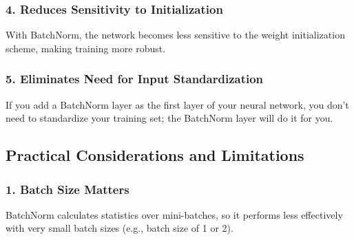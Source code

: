 \documentclass[
  letterpaper,
  DIV=11,
  numbers=noendperiod]{scrreprt}
\begin{document}
\subsubsection{4. Reduces Sensitivity to
Initialization}\label{reduces-sensitivity-to-initialization}

With BatchNorm, the network becomes less sensitive to the weight
initialization scheme, making training more robust.

\subsubsection{5. Eliminates Need for Input
Standardization}\label{eliminates-need-for-input-standardization}

If you add a BatchNorm layer as the first layer of your neural network,
you don't need to standardize your training set; the BatchNorm layer
will do it for you.

\subsection{Practical Considerations and
Limitations}\label{practical-considerations-and-limitations}

\subsubsection{1. Batch Size Matters}\label{batch-size-matters}

BatchNorm calculates statistics over mini-batches, so it performs less
effectively with very small batch sizes (e.g., batch size of 1 or 2).
\end{document}
